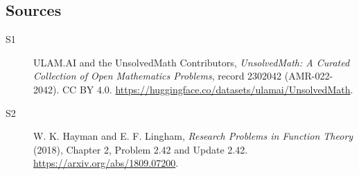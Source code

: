 \documentclass[11pt]{article}
\begin{document}
\subsection{Sources}
\begin{description}
\item[\hypertarget{source:2302042:1}{S1}] ULAM.AI and the UnsolvedMath Contributors, \emph{UnsolvedMath: A Curated Collection of Open Mathematics Problems}, record 2302042 (AMR-022-2042). CC BY 4.0. \url{https://huggingface.co/datasets/ulamai/UnsolvedMath}.
\item[\hypertarget{source:2302042:2}{S2}] W. K. Hayman and E. F. Lingham, \emph{Research Problems in Function Theory} (2018), Chapter 2, Problem 2.42 and Update 2.42. \url{https://arxiv.org/abs/1809.07200}.
\end{description}
\label{end:2302042}
\end{document}
